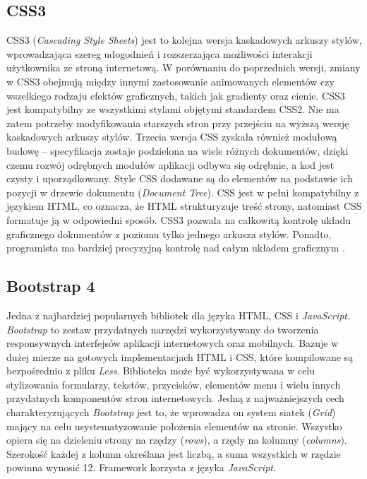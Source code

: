 \subsection{CSS3}
CSS3 (\textit{Cascading Style Sheets}) jest to kolejna wersja kaskadowych arkuszy stylów, wprowadzająca szereg udogodnień i rozszerzająca możliwości interakcji użytkownika ze stroną internetową. W porównaniu do poprzednich wersji, zmiany w CSS3 obejmują między innymi zastosowanie animowanych elementów czy wszelkiego rodzaju efektów graficznych, takich jak gradienty oraz cienie. 
CSS3 jest kompatybilny ze wszystkimi stylami objętymi standardem CSS2. Nie ma zatem potrzeby modyfikowania starszych stron przy przejściu na wyższą wersję kaskadowych arkuszy stylów. Trzecia wersja CSS zyskała również modułową budowę – specyfikacja zostaje podzielona na wiele różnych dokumentów, dzięki czemu rozwój odrębnych modułów aplikacji odbywa się odrębnie, a kod jest czysty i uporządkowany. 
Style CSS dodawane są do elementów na podstawie ich pozycji w drzewie dokumentu (\textit{Document Tree}). CSS jest w pełni kompatybilny z językiem HTML, co oznacza, że HTML strukturyzuje treść strony, natomiast CSS formatuje ją w odpowiedni sposób. CSS3 pozwala na całkowitą kontrolę układu graficznego dokumentów z poziomu tylko jednego arkusza stylów. Ponadto, programista ma bardziej precyzyjną kontrolę nad całym układem graficznym \cite{Css}.

\subsection{Bootstrap 4}
Jedna z najbardziej popularnych bibliotek dla języka HTML, CSS i \textit{JavaScript}. \textit{Bootstrap} to zestaw przydatnych narzędzi wykorzystywany do tworzenia responsywnych interfejsów aplikacji internetowych oraz mobilnych. Bazuje w dużej mierze na gotowych implementacjach HTML i CSS, które kompilowane są bezpośrednio z pliku \textit{Less}. Biblioteka może być wykorzystywana w celu stylizowania formularzy, tekstów, przycisków, elementów menu i wielu innych przydatnych komponentów stron internetowych. Jedną z najważniejszych cech charakteryzujących \textit{Bootstrap} jest to, że wprowadza on system siatek (\textit{Grid}) mający na celu usystematyzowanie położenia elementów na stronie. Wszystko opiera się na dzieleniu strony na rzędzy (\textit{rows}), a rzędy na kolumny (\textit{columns}). Szerokość każdej z kolumn określana jest liczbą, a suma wszystkich w rzędzie powinna wynosić 12. Framework korzysta z języka \textit{JavaScript}. 

